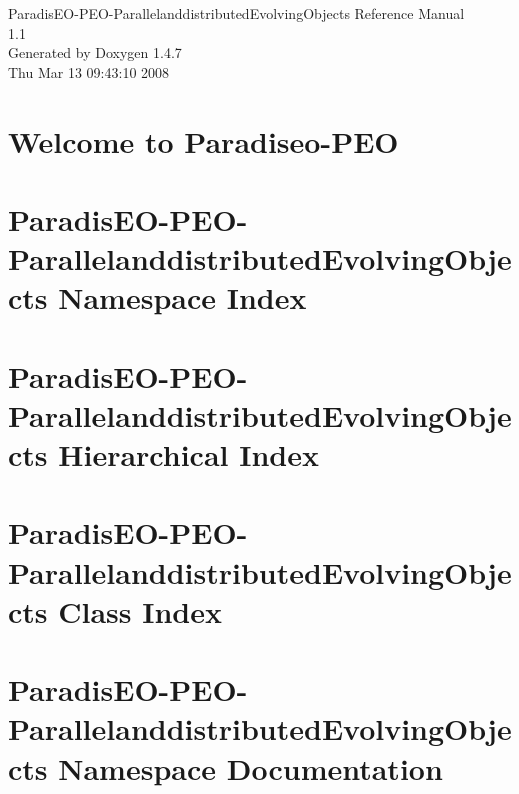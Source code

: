 \documentclass[a4paper]{book}
\begin{document}
\begin{titlepage}
\vspace*{7cm}
\begin{center}
{\Large Paradis\-EO-PEO-Parallelanddistributed\-Evolving\-Objects Reference Manual\\[1ex]\large 1.1 }\\
\vspace*{1cm}
{\large Generated by Doxygen 1.4.7}\\
\vspace*{0.5cm}
{\small Thu Mar 13 09:43:10 2008}\\
\end{center}
\end{titlepage}
\clearemptydoublepage
{}
\tableofcontents
\clearemptydoublepage
{}
\chapter{Welcome to Paradiseo-PEO }
\label{index}\hypertarget{index}{}
\chapter{Paradis\-EO-PEO-Parallelanddistributed\-Evolving\-Objects Namespace Index}

\chapter{Paradis\-EO-PEO-Parallelanddistributed\-Evolving\-Objects Hierarchical Index}

\chapter{Paradis\-EO-PEO-Parallelanddistributed\-Evolving\-Objects Class Index}

\chapter{Paradis\-EO-PEO-Parallelanddistributed\-Evolving\-Objects Namespace Documentation}

\end{document}
